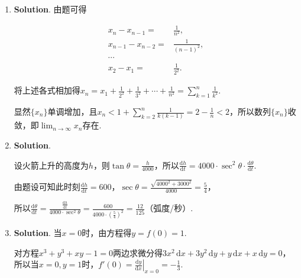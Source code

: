 \documentclass[../Main.tex]{subfiles}
\begin{document}
\begin{enumerate}
          且$x'_{t}=\frac{1}{2\sqrt{t}(1+t)}$，所以$x'_{t}(1)=\frac{1}{4}$.故
          \[
              \left.\frac{\mathrm{d}y}{\mathrm{d}x}\right|_{x=\frac{\pi}{4}}=\frac{y'_{t}(1)}{x'_{t}(1)}
              =-4.
          \]

          所以切线方程为
          \[
              y-1=-4\left(x-\frac{\pi}{4}\right)\quad\text{或}\quad 4x+y-1-\pi=0.
          \]

    \item \textbf{Solution}. 由题可得

          \[
              \begin{aligned}
                  x_{n}-x_{n-1}=   & \frac{1}{n^2},     \\
                  x_{n-1}-x_{n-2}= & \frac{1}{(n-1)^2}, \\
                  \cdots           &                    \\
                  x_{2}- x_{1}=    & \frac{1}{2^2}.
              \end{aligned}
          \]

          将上述各式相加得$x_{n}=x_{1}+\frac{1}{2^{2}}+\frac{1}{3^{2}}+\cdots+\frac{1}{n^{2}}
              =\sum_{k=1}^{n}\frac{1}{k^{2}}$.

          显然$\{x_{n}\}$单调增加，且$x_{n}<1+\sum_{k=2}^{n}\frac{1}{k(k-1)}=2-\frac{1}{n}
              <2$，所以数列$\{ x_{n}\}$收敛，即$\lim_{n\to\infty}x_{n}$存在.

    \item \textbf{Solution}.

          设火箭上升的高度为$h$，则$\tan\theta=\frac{h}{4000}$，所以$\frac{\mathrm{d}h}{\mathrm{d}t}
              =4000\cdot\sec^{2}\theta\cdot\frac{\mathrm{d}\theta}{\mathrm{d}t}$.

          由题设可知此时刻$\frac{\mathrm{d}h}{\mathrm{d}t}=600$，$\sec\theta=\frac{\sqrt{4000^{2}+3000^{2}}}{4000}
              =\frac{5}{4}$，

          所以$\frac{\mathrm{d}\theta}{\mathrm{d}t}=\frac{\frac{\mathrm{d}h}{\mathrm{d}t}}{4000\cdot\sec^{2}\theta}
              =\frac{600}{4000\cdot\left(\frac{5}{4}\right)^{2}}=\frac{12}{125}$（弧度/秒）.

    \item \textbf{Solution}. 当$x=0$时，由方程得$y=f(0)=1$.

          对方程$x^{3}+y^{3}+xy-1=0$两边求微分得$3x^{2}\,\mathrm{d}x+3y^{2}\,\mathrm{d}y+
              y\,\mathrm{d}x+x\,\mathrm{d}y=0$，所以当$x=0,y=1$时，$f'(0)=\left.\frac{\mathrm{d}y}{\mathrm{d}x}
              \right|_{x=0}=-\frac{1}{3}$.


\end{enumerate}
\end{document}
